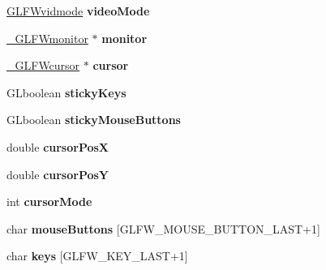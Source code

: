 \begin{DoxyCompactItemize}
\item 
\hypertarget{struct__GLFWwindow_a1045f1b6e36bf8632ac6e21a878c0ff7}{}\hyperlink{structGLFWvidmode}{G\+L\+F\+Wvidmode} {\bfseries video\+Mode}\label{struct__GLFWwindow_a1045f1b6e36bf8632ac6e21a878c0ff7}

\item 
\hypertarget{struct__GLFWwindow_a5e224ffa31032ad59906f92ea9a2d72f}{}\hyperlink{struct__GLFWmonitor}{\+\_\+\+G\+L\+F\+Wmonitor} $\ast$ {\bfseries monitor}\label{struct__GLFWwindow_a5e224ffa31032ad59906f92ea9a2d72f}

\item 
\hypertarget{struct__GLFWwindow_af0cb2966e8fafc49734d358773adf08d}{}\hyperlink{struct__GLFWcursor}{\+\_\+\+G\+L\+F\+Wcursor} $\ast$ {\bfseries cursor}\label{struct__GLFWwindow_af0cb2966e8fafc49734d358773adf08d}

\item 
\hypertarget{struct__GLFWwindow_ae513483acc6b74dc576b2b48a21f6599}{}G\+Lboolean {\bfseries sticky\+Keys}\label{struct__GLFWwindow_ae513483acc6b74dc576b2b48a21f6599}

\item 
\hypertarget{struct__GLFWwindow_a68a3c2123db9ada8fb33b43f4af7880c}{}G\+Lboolean {\bfseries sticky\+Mouse\+Buttons}\label{struct__GLFWwindow_a68a3c2123db9ada8fb33b43f4af7880c}

\item 
\hypertarget{struct__GLFWwindow_abc9a35e94411eeb3ba068edf263211ae}{}double {\bfseries cursor\+Pos\+X}\label{struct__GLFWwindow_abc9a35e94411eeb3ba068edf263211ae}

\item 
\hypertarget{struct__GLFWwindow_acaba7ed785260e0b02767f3ca94b1084}{}double {\bfseries cursor\+Pos\+Y}\label{struct__GLFWwindow_acaba7ed785260e0b02767f3ca94b1084}

\item 
\hypertarget{struct__GLFWwindow_a41835e55f4b1acfc155bee3441f771b6}{}int {\bfseries cursor\+Mode}\label{struct__GLFWwindow_a41835e55f4b1acfc155bee3441f771b6}

\item 
\hypertarget{struct__GLFWwindow_a46621a2d26782d04d5756d6a89cb64ec}{}char {\bfseries mouse\+Buttons} \mbox{[}G\+L\+F\+W\+\_\+\+M\+O\+U\+S\+E\+\_\+\+B\+U\+T\+T\+O\+N\+\_\+\+L\+A\+S\+T+1\mbox{]}\label{struct__GLFWwindow_a46621a2d26782d04d5756d6a89cb64ec}

\item 
\hypertarget{struct__GLFWwindow_ae24e65fe890037e48cff20066dd02c85}{}char {\bfseries keys} \mbox{[}G\+L\+F\+W\+\_\+\+K\+E\+Y\+\_\+\+L\+A\+S\+T+1\mbox{]}\label{struct__GLFWwindow_ae24e65fe890037e48cff20066dd02c85}


\end{DoxyCompactItemize}

